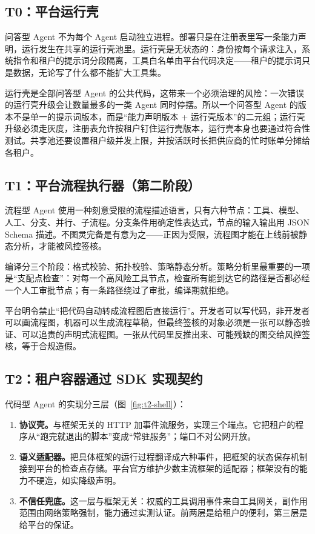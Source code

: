 \subsection{T0：平台运行壳}

问答型 Agent 不为每个 Agent 启动独立进程。部署只是在注册表里写一条能力声明，运行发生在共享的运行壳池里。运行壳是无状态的：身份按每个请求注入，系统指令和租户的提示词分段隔离，工具白名单由平台代码决定——租户的提示词只是数据，无论写了什么都不能扩大工具集。

运行壳是全部问答型 Agent 的公共代码，这带来一个必须治理的风险：一次错误的运行壳升级会让数量最多的一类 Agent 同时停摆。所以一个问答型 Agent 的版本不是单一的提示词版本，而是“能力声明版本 + 运行壳版本”的二元组；运行壳升级必须走灰度，注册表允许按租户钉住运行壳版本，运行壳本身也要通过符合性测试。共享池还要设置租户级并发上限，并按活跃时长把供应商的忙时账单分摊给各租户。

\subsection{T1：平台流程执行器（第二阶段）}

流程型 Agent 使用一种刻意受限的流程描述语言，只有六种节点：工具、模型、人工、分支、并行、子流程。分支条件用确定性表达式，节点的输入输出用 JSON Schema 描述。不图灵完备是有意为之——正因为受限，流程图才能在上线前被静态分析，才能被风控签核。

编译分三个阶段：格式校验、拓扑校验、策略静态分析。策略分析里最重要的一项是“支配点检查”：对每一个高风险工具节点，检查所有能到达它的路径是否都必经一个人工审批节点；有一条路径绕过了审批，编译期就拒绝。

平台明令禁止“把代码自动转成流程图后直接运行”。开发者可以写代码，非开发者可以画流程图，机器可以生成流程草稿，但最终签核的对象必须是一张可以静态验证、可以追责的声明式流程图。一张从代码里反推出来、可能残缺的图交给风控签核，等于合规造假。

\subsection{T2：租户容器通过 SDK 实现契约}

代码型 Agent 的实现分三层（图~\ref{fig:t2-shell}）：

\begin{enumerate}
  \item \textbf{协议壳。}与框架无关的 HTTP 加事件流服务，实现三个端点。它把租户的程序从“跑完就退出的脚本”变成“常驻服务”；端口不对公网开放。
  \item \textbf{语义适配器。}把具体框架的运行过程翻译成六种事件，把框架的状态保存机制接到平台的检查点存储。平台官方维护少数主流框架的适配器；框架没有的能力不硬造，如实降级声明。
  \item \textbf{不信任兜底。}这一层与框架无关：权威的工具调用事件来自工具网关，副作用范围由网络策略强制，能力通过实测认证。前两层是给租户的便利，第三层是给平台的保证。
\end{enumerate}

